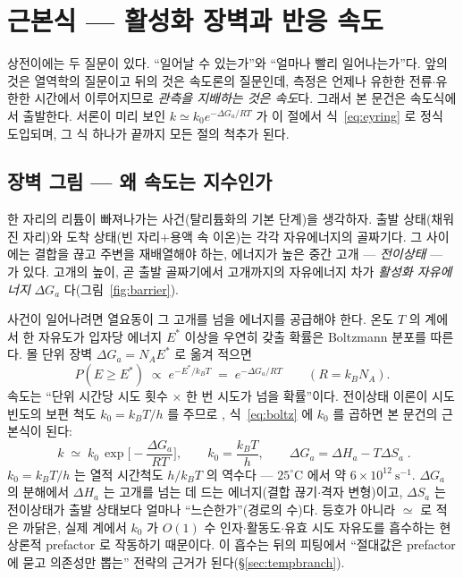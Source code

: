 \documentclass[11pt,a4paper]{article}
\begin{document}
\section{근본식 — 활성화 장벽과 반응 속도}\label{sec:rate}
상전이에는 두 질문이 있다. ``일어날 수 있는가''와 ``얼마나 빨리 일어나는가''다. 앞의 것은 열역학의 질문이고
뒤의 것은 속도론의 질문인데, 측정은 언제나 유한한 전류$\cdot$유한한 시간에서 이루어지므로 \emph{관측을
지배하는 것은 속도}다. 그래서 본 문건은 속도식에서 출발한다. 서론이 미리 보인 $k\simeq k_0e^{-\Delta G_a/RT}$ 가 이
절에서 식~\eqref{eq:eyring} 로 정식 도입되며, 그 식 하나가 끝까지 모든 절의 척추가 된다.

\subsection{장벽 그림 — 왜 속도는 지수인가}
한 자리의 리튬이 빠져나가는 사건(탈리튬화의 기본 단계)을 생각하자. 출발 상태(채워진 자리)와 도착 상태(빈
자리$+$용액 속 이온)는 각각 자유에너지의 골짜기다. 그 사이에는 결합을 끊고 주변을 재배열해야 하는, 에너지가
높은 중간 고개 — \emph{전이상태} — 가 있다. 고개의 높이, 곧 출발 골짜기에서 고개까지의 자유에너지 차가
\emph{활성화 자유에너지} $\Delta G_a$ 다(그림~\ref{fig:barrier}).

사건이 일어나려면 열요동이 그 고개를 넘을 에너지를 공급해야 한다. 온도 $T$ 의 계에서 한 자유도가
입자당 에너지 $E^*$ 이상을 우연히 갖출 확률은 Boltzmann 분포를 따른다. 몰 단위 장벽
$\Delta G_a=N_AE^*$ 로 옮겨 적으면
\begin{equation}
P(E\ge E^*)\;\propto\;e^{-E^*/k_BT}
\;=\;e^{-\Delta G_a/RT}\qquad(R=k_BN_A).
\label{eq:boltz}
\end{equation}
속도는 ``단위 시간당 시도 횟수 $\times$ 한 번 시도가 넘을 확률''이다. 전이상태 이론이 시도 빈도의
보편 척도 $k_0=k_BT/h$ 를 주므로 \cite{eyring1935}, 식~\eqref{eq:boltz} 에 $k_0$ 를 곱하면 본
문건의 근본식이 된다:
\begin{equation}
\boxed{\;k\;\simeq\;k_0\,\exp\!\Big[-\frac{\Delta G_a}{RT}\Big],\qquad
k_0=\frac{k_BT}{h},\qquad \Delta G_a=\Delta H_a-T\Delta S_a\;.}
\label{eq:eyring}
\end{equation}
$k_0=k_BT/h$ 는 열적 시간척도 $h/k_BT$ 의 역수다 — $25^\circ$C 에서 약
$6\times10^{12}\ \mathrm{s^{-1}}$.
$\Delta G_a$ 의 분해에서 $\Delta H_a$ 는 고개를 넘는 데 드는 에너지(결합 끊기$\cdot$격자 변형)이고,
$\Delta S_a$ 는 전이상태가 출발 상태보다 얼마나 ``느슨한가''(경로의 수)다. 등호가 아니라 $\simeq$ 로 적은
까닭은, 실제 계에서 $k_0$ 가 $O(1)$ 수 인자$\cdot$활동도$\cdot$유효 시도 자유도를 흡수하는 현상론적
prefactor 로 작동하기 때문이다. 이 흡수는 뒤의 피팅에서 ``절대값은 prefactor 에 묻고 의존성만 뽑는'' 전략의
근거가 된다(\S\ref{sec:tempbranch}).
\end{document}
